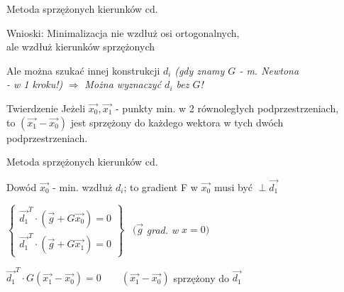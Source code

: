   \begin{frame}{Metoda sprzężonych kierunków cd.}

 	\begin{block}{Wnioski:}
			Minimalizacja nie wzdłuż osi ortogonalnych,
			\\ale wzdłuż kierunków sprzężonych
 	\end{block}
 	\begin{block}{}
		Ale można szukać innej konstrukcji $d_i$ \emph{(gdy znamy $G$ - m. Newtona
		\\- w 1 kroku!)} $\Rightarrow$ \emph{Można wyznaczyć $d_i$ bez $G$!}
 	\end{block}
 	\begin{block}{Twierdzenie}
		Jeżeli $\vec{x_0}, \vec{x_1}$ - punkty min. w 2 równoległych podprzestrzeniach,
		\\to $(\vec{x_1} - \vec{x_0})$ jest sprzężony do każdego wektora w tych dwóch podprzestrzeniach.
 	\end{block}

  \end{frame}

  \begin{frame}{Metoda sprzężonych kierunków cd. }

 	\begin{block}{Dowód}
	  $\vec{x_0}$ - min. wzdłuż $d_i$; to gradient F w $\vec{x_0}$ musi być $\perp \vec{d_1}$
	  \smallskip
	  \begin{center}
	    $ \left\{
          \begin{array}{l}
            \vec{d_1}^T \cdot (\vec{g} + G \vec{x_0}) = 0 \\
            \vec{d_1}^T \cdot (\vec{g} + G \vec{x_1}) = 0
	      \end{array}
	    \right\} $
	    \ $(\vec{g}$ \emph{grad. w} $x = 0)$
	  \end{center}
	  \begin{center}
	    $\vec{d_1}^T \cdot G (\vec{x_1} - \vec{x_0}) = 0 \qquad (\vec{x_1} - \vec{x_0})$ sprzężony do $\vec{d_1}$
	  \end{center}
 	\end{block}

  \end{frame}

